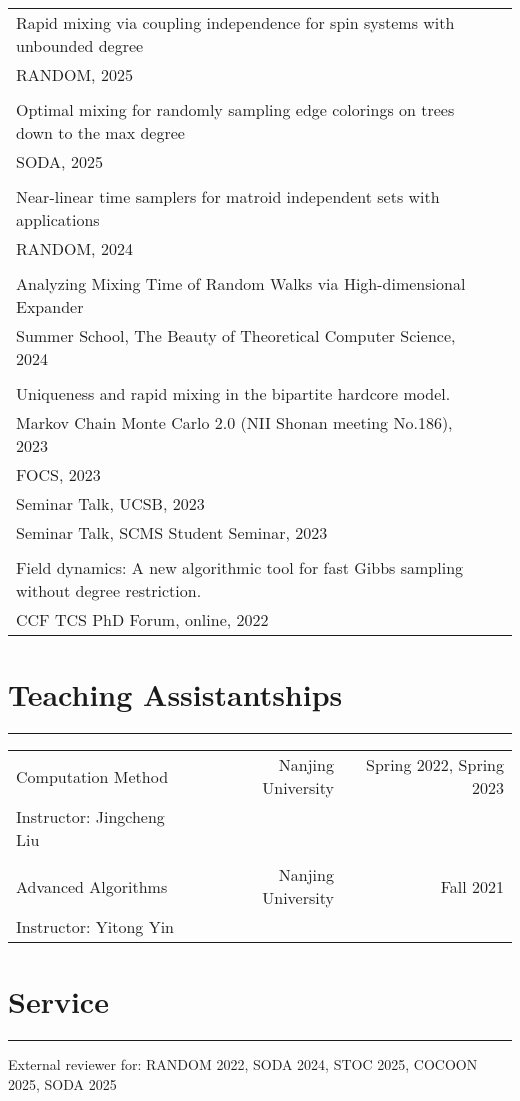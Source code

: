\documentclass{article}
\begin{document}
\begin{tabularx}{\textwidth}{@{\hskip 0pt}lX@{\hskip 0pt}}
Rapid mixing via coupling independence for spin systems with unbounded degree\\
\hspace{20pt} RANDOM, 2025\\
\\
Optimal mixing for randomly sampling edge colorings on trees down to the max degree \\
\hspace{20pt} SODA, 2025 \\
\\
Near-linear time samplers for matroid independent sets with applications \\
\hspace{20pt} RANDOM, 2024 \\
\\
Analyzing Mixing Time of Random Walks via High-dimensional Expander \\
\hspace{20pt} Summer School, The Beauty of Theoretical Computer Science, 2024\\
\\
Uniqueness and rapid mixing in the bipartite hardcore model. & \\
\hspace{20pt} Markov Chain Monte Carlo 2.0 (NII Shonan meeting No.186), 2023 \\
\hspace{20pt} FOCS, 2023\\
\hspace{20pt} Seminar Talk, UCSB, 2023\\
\hspace{20pt} Seminar Talk, SCMS Student Seminar, 2023\\
\\
Field dynamics: A new algorithmic tool for fast Gibbs sampling without degree restriction. & \\
\hspace{20pt} CCF TCS PhD Forum, online, 2022
\end{tabularx}

\section*{Teaching Assistantships}
\vspace{-1em} \hrule \vspace{1em}

\begin{tabularx}{\textwidth}{@{\hskip 0pt}lXrr@{\hskip 0pt}}
  \large Computation Method & & Nanjing University & Spring 2022, Spring 2023 \\
  Instructor: Jingcheng Liu \\
  \\
  \large Advanced Algorithms & & Nanjing University & Fall 2021 \\ 
  Instructor: Yitong Yin
\end{tabularx}

\section*{Service}
\vspace{-1em} \hrule \vspace{1em}

External reviewer for: RANDOM 2022, SODA 2024, STOC 2025, COCOON 2025, SODA 2025
\end{document}
